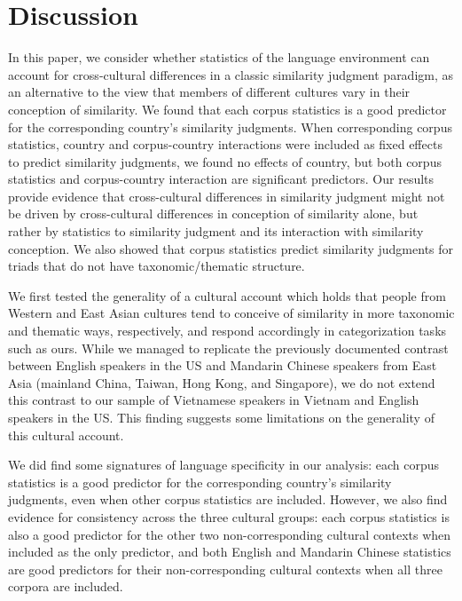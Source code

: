 \documentclass[10pt, letterpaper]{article}
\begin{document}
\hypertarget{discussion}{%
\section{Discussion}\label{discussion}}

In this paper, we consider whether statistics of the language
environment can account for cross-cultural differences in a classic
similarity judgment paradigm, as an alternative to the view that members
of different cultures vary in their conception of similarity. We found
that each corpus statistics is a good predictor for the corresponding
country's similarity judgments. When corresponding corpus statistics,
country and corpus-country interactions were included as fixed effects
to predict similarity judgments, we found no effects of country, but
both corpus statistics and corpus-country interaction are significant
predictors. Our results provide evidence that cross-cultural differences
in similarity judgment might not be driven by cross-cultural differences
in conception of similarity alone, but rather by statistics to
similarity judgment and its interaction with similarity conception. We
also showed that corpus statistics predict similarity judgments for
triads that do not have taxonomic/thematic structure.

We first tested the generality of a cultural account which holds that
people from Western and East Asian cultures tend to conceive of
similarity in more taxonomic and thematic ways, respectively, and
respond accordingly in categorization tasks such as ours. While we
managed to replicate the previously documented contrast between English
speakers in the US and Mandarin Chinese speakers from East Asia
(mainland China, Taiwan, Hong Kong, and Singapore), we do not extend
this contrast to our sample of Vietnamese speakers in Vietnam and
English speakers in the US. This finding suggests some limitations on
the generality of this cultural account.

We did find some signatures of language specificity in our analysis:
each corpus statistics is a good predictor for the corresponding
country's similarity judgments, even when other corpus statistics are
included. However, we also find evidence for consistency across the
three cultural groups: each corpus statistics is also a good predictor
for the other two non-corresponding cultural contexts when included as
the only predictor, and both English and Mandarin Chinese statistics are
good predictors for their non-corresponding cultural contexts when all
three corpora are included.
\end{document}
